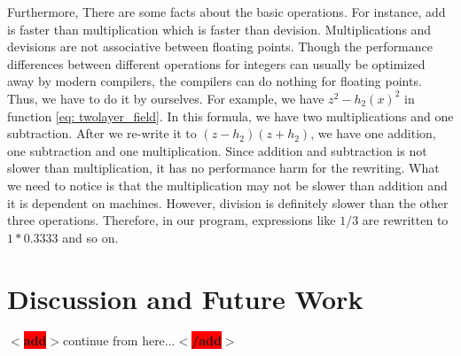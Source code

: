 \documentclass[12pt]{report}
\newcommand{\add}[1]{
  $<$\colorbox{red}{\textbf{add}}$>$#1$<$\colorbox{red}{\textbf{/add}}$>$
}
\begin{document}
          Furthermore, There are some facts about the basic operations. For instance, add is faster than 
          multiplication which is faster than devision. Multiplications and devisions are not associative
          between floating points. 
          Though the performance differences between different operations for integers can usually be 
          optimized 
          away by modern compilers, the compilers can do nothing for floating points. Thus, we have to do 
          it 
          by ourselves. For example, we have $z^2 - h_2\left(x\right)^2$ in function 
          \ref{eq: twolayer_field}.
          In this formula, we have two multiplications and one subtraction. After we re-write it to 
          $\left(z-h_2\right)\left(z + h_2\right)$, we have one addition, one subtraction and one 
          multiplication.
          Since addition and subtraction is not slower than multiplication, it has no performance harm 
          for the rewriting. What we need to notice is that the multiplication may not be slower than 
          addition
          and it is dependent on machines. However, division is definitely slower than the other three operations. 
          Therefore, in our program, expressions like $1 / 3$ are rewritten to $1*0.3333$ and so on.  

      \chapter{Discussion and Future Work}
          
          \add{continue from here...}


        





          
\end{document}
